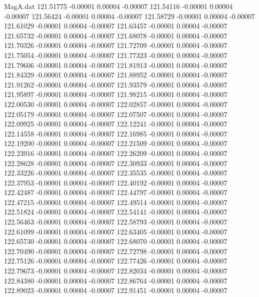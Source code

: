 \begin{filecontents}{MagA.dat}
 121.51775   -0.00001    0.00004   -0.00007
 121.54116   -0.00001    0.00004   -0.00007
 121.56424   -0.00001    0.00004   -0.00007
 121.58729   -0.00001    0.00004   -0.00007
 121.61029   -0.00001    0.00004   -0.00007
 121.63457   -0.00001    0.00004   -0.00007
 121.65732   -0.00001    0.00004   -0.00007
 121.68078   -0.00001    0.00004   -0.00007
 121.70326   -0.00001    0.00004   -0.00007
 121.72709   -0.00001    0.00004   -0.00007
 121.75054   -0.00001    0.00004   -0.00007
 121.77323   -0.00001    0.00004   -0.00007
 121.79606   -0.00001    0.00004   -0.00007
 121.81913   -0.00001    0.00004   -0.00007
 121.84329   -0.00001    0.00004   -0.00007
 121.88952   -0.00001    0.00004   -0.00007
 121.91262   -0.00001    0.00004   -0.00007
 121.93579   -0.00001    0.00004   -0.00007
 121.95897   -0.00001    0.00004   -0.00007
 121.98215   -0.00001    0.00004   -0.00007
 122.00530   -0.00001    0.00004   -0.00007
 122.02857   -0.00001    0.00004   -0.00007
 122.05179   -0.00001    0.00004   -0.00007
 122.07507   -0.00001    0.00004   -0.00007
 122.09925   -0.00001    0.00004   -0.00007
 122.12241   -0.00001    0.00004   -0.00007
 122.14558   -0.00001    0.00004   -0.00007
 122.16985   -0.00001    0.00004   -0.00007
 122.19200   -0.00001    0.00004   -0.00007
 122.21509   -0.00001    0.00004   -0.00007
 122.23916   -0.00001    0.00004   -0.00007
 122.26209   -0.00001    0.00004   -0.00007
 122.28628   -0.00001    0.00004   -0.00007
 122.30933   -0.00001    0.00004   -0.00007
 122.33226   -0.00001    0.00004   -0.00007
 122.35535   -0.00001    0.00004   -0.00007
 122.37953   -0.00001    0.00004   -0.00007
 122.40192   -0.00001    0.00004   -0.00007
 122.42487   -0.00001    0.00004   -0.00007
 122.44797   -0.00001    0.00004   -0.00007
 122.47215   -0.00001    0.00004   -0.00007
 122.49514   -0.00001    0.00004   -0.00007
 122.51824   -0.00001    0.00004   -0.00007
 122.54141   -0.00001    0.00004   -0.00007
 122.56463   -0.00001    0.00004   -0.00007
 122.58793   -0.00001    0.00004   -0.00007
 122.61099   -0.00001    0.00004   -0.00007
 122.63405   -0.00001    0.00004   -0.00007
 122.65730   -0.00001    0.00004   -0.00007
 122.68070   -0.00001    0.00004   -0.00007
 122.70490   -0.00001    0.00004   -0.00007
 122.72798   -0.00001    0.00004   -0.00007
 122.75126   -0.00001    0.00004   -0.00007
 122.77426   -0.00001    0.00004   -0.00007
 122.79673   -0.00001    0.00004   -0.00007
 122.82034   -0.00001    0.00004   -0.00007
 122.84380   -0.00001    0.00004   -0.00007
 122.86764   -0.00001    0.00004   -0.00007
 122.89023   -0.00001    0.00004   -0.00007
 122.91451   -0.00001    0.00004   -0.00007

\end{filecontents}
